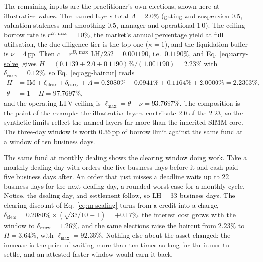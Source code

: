 The remaining inputs are the practitioner's own elections, shown here at illustrative values. The named layers total $\Lambda=2.0\%$ (gating and suspension $0.5$, valuation staleness and smoothing $0.5$, manager and operational $1.0$). The ceiling borrow rate is $r^{B,\max}=10\%$, the market's annual percentage yield at full utilisation, the due-diligence tier is the top one ($\kappa=1$), and the liquidation buffer is $\nu=4$\,pp. Then $c=r^{B,\max}\,\mathrm{LH}/252=0.001190$, i.e.\ $0.1190\%$, and Eq.~\eqref{eq:carry-solve} gives $H=(0.1139+2.0+0.1190)\%/(1.001190)=2.23\%$ with $\delta_{\mathrm{carry}}=0.12\%$, so Eq.~\eqref{eq:agg-haircut} reads
\begin{equation}\label{eq:example}
\begin{aligned}
H&=\mathrm{IM}+\delta_{\mathrm{clear}}+\delta_{\mathrm{carry}}+\Lambda
=0.2080\%-0.0941\%+0.1164\%+2.0000\%=2.2303\%,\\
\theta&=1-H=97.7697\% ,
\end{aligned}
\end{equation}
and the operating LTV ceiling is $\ell_{\max}=\theta-\nu=93.7697\%$. The composition is the point of the example: the illustrative layers contribute $2.0$ of the $2.23$, so the synthetic limits reflect the named layers far more than the inherited SIMM core. The three-day window is worth $0.36$\,pp of borrow limit against the same fund at a window of ten business days.

The same fund at monthly dealing shows the clearing window doing work. Take a
monthly dealing day with orders due five business days before it and cash paid five
business days after. An order that just misses a deadline waits up to 22 business
days for the next dealing day, a rounded worst case for a monthly cycle. Notice, the
dealing day, and settlement follow, so $\mathrm{LH}=33$ business days. The clearing discount of Eq.~\eqref{eq:m-scaling} turns from a credit into a charge, $\delta_{\mathrm{clear}}=0.2080\%\times(\sqrt{33/10}-1)=+0.17\%$, the interest cost grows with the window to $\delta_{\mathrm{carry}}=1.26\%$, and the same elections raise the haircut from $2.23\%$ to $H=3.64\%$, with $\ell_{\max}=92.36\%$. Nothing else about the asset changed: the increase is the price of waiting more than ten times as long for the issuer to settle, and an attested faster window would earn it back.
